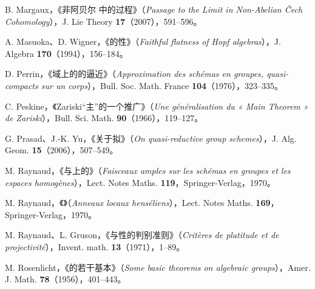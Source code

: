 \par\noindent [Ma07] B. Margaux，《非阿贝尔 中的过程》（\textit{Passage to the Limit in Non-Abelian Čech Cohomology}），J. Lie Theory \textbf{17}（2007），591--596。
\par\noindent [MW94] A. Masuoka、D. Wigner，《的性》（\textit{Faithful flatness of Hopf algebras}），J. Algebra \textbf{170}（1994），156--184。
\par\noindent [Per76] D. Perrin，《域上的的逼近》（\textit{Approximation des schémas en groupes, quasi-compacts sur un corps}），Bull. Soc. Math. France \textbf{104}（1976），323--335。
\par\noindent [Pes66] C. Peskine，《Zariski“主”的一个推广》（\textit{Une généralisation du « Main Theorem » de Zariski}），Bull. Sci. Math. \textbf{90}（1966），119--127。
\par\noindent [PY06] G. Prasad、J.-K. Yu，《关于拟》（\textit{On quasi-reductive group schemes}），J. Alg. Geom. \textbf{15}（2006），507--549。
\par\noindent [Ray70a] M. Raynaud，《与上的》（\textit{Faisceaux amples sur les schémas en groupes et les espaces homogènes}），Lect. Notes Maths. \textbf{119}，Springer-Verlag，1970。
\par\noindent [Ray70b] M. Raynaud，《》（\textit{Anneaux locaux henséliens}），Lect. Notes Maths. \textbf{169}，Springer-Verlag，1970。
\par\noindent [RG71] M. Raynaud、L. Gruson，《与性的判别准则》（\textit{Critères de platitude et de projectivité}），Invent. math. \textbf{13}（1971），1--89。
\par\noindent [Ro56] M. Rosenlicht，《的若干基本》（\textit{Some basic theorems on algebraic groups}），Amer. J. Math. \textbf{78}（1956），401--443。

